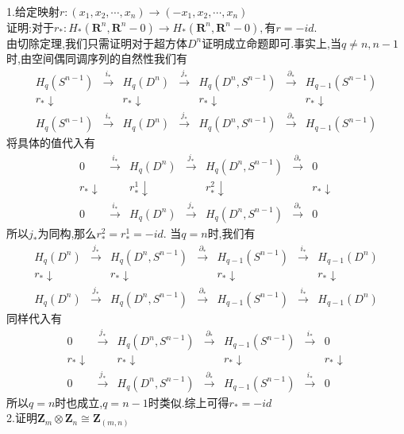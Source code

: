 \documentclass[b5paper]{ctexart}
\begin{document}
\pagestyle{plain}
\noindent
{}
1.给定映射$r:(x_1,x_2,\cdots,x_n)\rightarrow (-x_1,x_2,\cdots,x_n)$\\
证明:对于$r_*:H_*(\mathbf{R}^n,\mathbf{R}^n-0)\rightarrow H_*(\mathbf{R}^n,\mathbf{R}^n-0),$有$r=-id$.\\
由切除定理,我们只需证明对于超方体$D^n$证明成立命题即可.事实上,当$q\neq n,n-1$时,由空间偶同调序列的自然性我们有
\[
\begin{array}{ccccccc}
H_q(S^{n-1})&\xrightarrow{i_*} & H_q(D^n)&\xrightarrow{j_*}& H_q(D^n,S^{n-1})&\xrightarrow{\partial_*}& H_{q-1}(S^{n-1})\\
r_*\downarrow& & r_*\downarrow& & r_*\downarrow& & r_*\downarrow\\
H_q(S^{n-1})&\xrightarrow{i_*} & H_q(D^n)&\xrightarrow{j_*}& H_q(D^n,S^{n-1})&\xrightarrow{\partial_*}& H_{q-1}(S^{n-1})
\end{array}\]
将具体的值代入有
\[
\begin{array}{ccccccc}
0&\xrightarrow{i_*} & H_q(D^n)&\xrightarrow{j_*}& H_q(D^n,S^{n-1})&\xrightarrow{\partial_*}& 0\\
r_*\downarrow& & r_*^1\downarrow& & r_*^2\downarrow& & r_*\downarrow\\
0&\xrightarrow{i_*} & H_q(D^n)&\xrightarrow{j_*}& H_q(D^n,S^{n-1})&\xrightarrow{\partial_*}& 0
\end{array}\]
所以$j_*$为同构,那么$r_*^2=r_*^1=-id$.
当$q=n$时,我们有
\[
\begin{array}{ccccccc}
 H_q(D^n)&\xrightarrow{j_*}& H_q(D^n,S^{n-1})&\xrightarrow{\partial_*}& H_{q-1}(S^{n-1})&\xrightarrow{i_*} &H_{q-1}(D^n)\\
r_*\downarrow& & r_*\downarrow& & r_*\downarrow& & r_*\downarrow\\
 H_q(D^n)&\xrightarrow{j_*}& H_q(D^n,S^{n-1})&\xrightarrow{\partial_*}& H_{q-1}(S^{n-1})&\xrightarrow{i_*} &H_{q-1}(D^n)
\end{array}\]
同样代入有
\[\begin{array}{ccccccc}
 0&\xrightarrow{j_*}& H_q(D^n,S^{n-1})&\xrightarrow{\partial_*}& H_{q-1}(S^{n-1})&\xrightarrow{i_*} & 0\\
r_*\downarrow& & r_*\downarrow& & r_*\downarrow& & r_*\downarrow\\
 0&\xrightarrow{j_*}& H_q(D^n,S^{n-1})&\xrightarrow{\partial_*}& H_{q-1}(S^{n-1})&\xrightarrow{i_*} & 0
\end{array}\]
所以$q=n$时也成立,$q=n-1$时类似.综上可得$r_*=-id$\\
2.证明$\mathbf{Z}_m\otimes \mathbf{Z}_n\cong  \mathbf{Z}_{(m,n)}$\\
\end{document}

